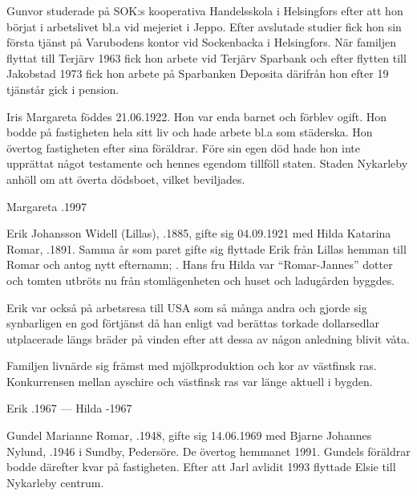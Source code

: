 Gunvor studerade på SOK:s kooperativa Handelsskola i Helsingfors efter att hon börjat i arbetslivet bl.a vid mejeriet i Jeppo. Efter avslutade studier fick hon sin första tjänst på Varubodens kontor vid Sockenbacka i Helsingfors. När familjen flyttat till Terjärv 1963 fick hon arbete vid Terjärv Sparbank och efter flytten till Jakobstad 1973 fick hon arbete på Sparbanken Deposita därifrån hon efter 19 tjänstår gick i pension.


Iris Margareta föddes 21.06.1922. Hon var enda barnet och förblev ogift. Hon bodde på fastigheten hela sitt liv och hade arbete bl.a som städerska. Hon övertog fastigheten efter sina föräldrar. Före sin egen död hade hon inte upprättat något testamente och hennes egendom tillföll staten. Staden Nykarleby anhöll om att överta dödsboet, vilket beviljades.

Margareta .1997


Erik Johansson Widell (Lillas), .1885, gifte sig 04.09.1921 med Hilda Katarina Romar, .1891. Samma år som paret gifte sig flyttade Erik från Lillas hemman till Romar och antog nytt efternamn; . Hans fru Hilda var ``Romar-Jannes'' dotter och tomten utbröts nu från stomlägenheten och huset och ladugården byggdes.

Erik var också på arbetsresa till USA som så många andra och gjorde sig synbarligen en god förtjänst då han enligt vad berättas torkade
dollarsedlar utplacerade längs bräder på vinden efter att dessa av någon anledning blivit våta.

Familjen livnärde sig främst med mjölkproduktion och kor av västfinsk ras. Konkurrensen mellan ayschire och västfinsk ras var länge aktuell i bygden.

Erik .1967  ---  Hilda -1967






Gundel Marianne Romar, .1948, gifte sig 14.06.1969 med Bjarne Johannes Nylund, .1946 i Sundby, Pedersöre. De övertog hemmanet 1991. Gundels föräldrar bodde därefter kvar på fastigheten. Efter att Jarl avlidit 1993 flyttade Elsie till Nykarleby centrum.


